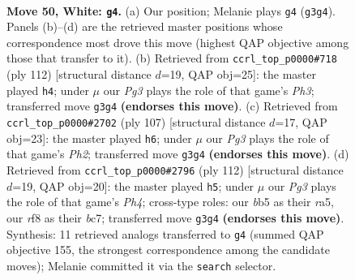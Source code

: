 \documentclass[11pt]{article}
\begin{document}
\clearpage

\begin{figure}[p]\centering
\begin{subfigure}{0.46\textwidth}\centering
\resizebox{\linewidth}{!}{%
\newchessgame
\chessboard[
  setfen={5r2/4k3/8/1b2p3/pP2N3/R3K1P1/8/8 w - - 13 50},
  showmover=false,
  pgfstyle=straightmove, color=movearrow, markmove={g3-g4}
]}
\caption{}
\end{subfigure}\hfill
\begin{subfigure}{0.46\textwidth}\centering
\resizebox{\linewidth}{!}{%
\newchessgame
\chessboard[
  setfen={7k/r7/5pR1/4bN1p/8/7P/5PK1/8 w - - 20 57},
  showmover=false,
  pgfstyle=straightmove, color=movearrow, markmove={h3-h4}
]}
\caption{}
\end{subfigure}
\\[4pt]
\begin{subfigure}{0.46\textwidth}\centering
\resizebox{\linewidth}{!}{%
\newchessgame
\chessboard[
  setfen={3n4/r2k2pp/P7/8/8/3B4/3K4/4R3 b - - 10 54},
  showmover=false,
  pgfstyle=straightmove, color=movearrow, markmove={h7-h6}
]}
\caption{}
\end{subfigure}\hfill
\begin{subfigure}{0.46\textwidth}\centering
\resizebox{\linewidth}{!}{%
\newchessgame
\chessboard[
  setfen={8/2b5/8/rp1k1p2/1R5P/3N4/4P1K1/8 w - - 0 57},
  showmover=false,
  pgfstyle=straightmove, color=movearrow, markmove={h4-h5}
]}
\caption{}
\end{subfigure}
\caption{\textbf{Move 50, White: \texttt{g4}.} (a) Our position; Melanie plays \texttt{g4} (\texttt{g3g4}). Panels (b)--(d) are the retrieved master positions whose correspondence most drove this move (highest QAP objective among those that transfer to it). (b) Retrieved from \texttt{ccrl\_top\_p0000\#718} (ply 112) [structural distance $d$=19, QAP obj=25]: the master played \texttt{h4}; under $\mu$ our \emph{Pg3} plays the role of that game's \emph{Ph3}; transferred move \texttt{g3g4} \textbf{(endorses this move)}. (c) Retrieved from \texttt{ccrl\_top\_p0000\#2702} (ply 107) [structural distance $d$=17, QAP obj=23]: the master played \texttt{h6}; under $\mu$ our \emph{Pg3} plays the role of that game's \emph{Ph2}; transferred move \texttt{g3g4} \textbf{(endorses this move)}. (d) Retrieved from \texttt{ccrl\_top\_p0000\#2796} (ply 112) [structural distance $d$=19, QAP obj=20]: the master played \texttt{h5}; under $\mu$ our \emph{Pg3} plays the role of that game's \emph{Ph4}; cross-type roles: our \emph{b}b5 as their \emph{r}a5, our \emph{r}f8 as their \emph{b}c7; transferred move \texttt{g3g4} \textbf{(endorses this move)}. Synthesis: 11 retrieved analogs transferred to \texttt{g4} (summed QAP objective 155, the strongest correspondence among the candidate moves); Melanie committed it via the \texttt{search} selector.}
\label{fig:thought-m98}
\end{figure}
\end{document}
